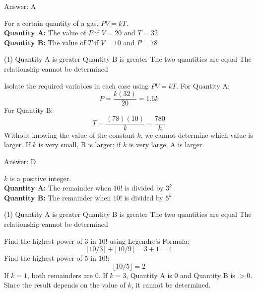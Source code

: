 \documentclass[11pt,paper=a4,answers]{exam}
\begin{document}
\begin{questions}
\begin{solution}
Answer: \colorbox{yellow!100}{A}
\end{solution}

\vspace{1cm}

\question
For a certain quantity of a gas, $PV = kT$.
\\[0.3cm]
\textbf{Quantity A: } The value of $P$ if $V = 20$ and $T = 32$ \\
\textbf{Quantity B: } The value of $T$ if $V = 10$ and $P = 78$

\begin{tasks}(1)
\task[A)] Quantity A is greater
\task[B)] Quantity B is greater
\task[C)] The two quantities are equal
\task[D)] The relationship cannot be determined
\end{tasks}

\begin{solution}
Isolate the required variables in each case using $PV = kT$.
\vspace{5pt}
For Quantity A:
\vspace{5pt}
\[ P = \dfrac{k(32)}{20} = 1.6k \]
\vspace{5pt}
For Quantity B:
\vspace{5pt}
\[ T = \dfrac{(78)(10)}{k} = \dfrac{780}{k} \]
\vspace{5pt}
Without knowing the value of the constant $k$, we cannot determine which value is larger.
\vspace{5pt}
If $k$ is very small, B is larger; if $k$ is very large, A is larger.

Answer: \colorbox{yellow!100}{D}
\end{solution}

\vspace{1cm}

\question
$k$ is a positive integer.
\\[0.3cm]
\textbf{Quantity A: } The remainder when $10!$ is divided by $3^k$ \\
\textbf{Quantity B: } The remainder when $10!$ is divided by $5^k$

\begin{tasks}(1)
\task[A)] Quantity A is greater
\task[B)] Quantity B is greater
\task[C)] The two quantities are equal
\task[D)] The relationship cannot be determined
\end{tasks}

\begin{solution}
Find the highest power of 3 in $10!$ using Legendre's Formula:
\vspace{5pt}
\[ \lfloor 10/3 \rfloor + \lfloor 10/9 \rfloor = 3 + 1 = 4 \]
\vspace{5pt}
Find the highest power of 5 in $10!$:
\vspace{5pt}
\[ \lfloor 10/5 \rfloor = 2 \]
\vspace{5pt}
If $k = 1$, both remainders are 0. If $k = 3$, Quantity A is 0 and Quantity B is $> 0$.
\vspace{5pt}
Since the result depends on the value of $k$, it cannot be determined.


\end{solution}
\end{questions}
\end{document}
